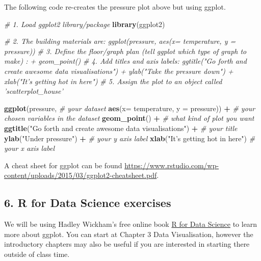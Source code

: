 \documentclass[]{article}
\newenvironment{Shaded}{\begin{snugshade}}{\end{snugshade}}
\newcommand{\CommentTok}[1]{\textcolor[rgb]{0.56,0.35,0.01}{\textit{#1}}}
\newcommand{\DataTypeTok}[1]{\textcolor[rgb]{0.13,0.29,0.53}{#1}}
\newcommand{\KeywordTok}[1]{\textcolor[rgb]{0.13,0.29,0.53}{\textbf{#1}}}
\newcommand{\NormalTok}[1]{#1}
\newcommand{\OperatorTok}[1]{\textcolor[rgb]{0.81,0.36,0.00}{\textbf{#1}}}
\newcommand{\StringTok}[1]{\textcolor[rgb]{0.31,0.60,0.02}{#1}}
\begin{document}
The following code re-creates the pressure plot above but using ggplot.

\begin{Shaded}
\begin{Highlighting}[]
\CommentTok{# 1. Load ggplot2 library/package}
\KeywordTok{library}\NormalTok{(ggplot2)}

\CommentTok{# 2. The building materials are: ggplot(pressure, aes(x= temperature, y = pressure)) }
\CommentTok{# 3. Define the floor/graph plan (tell ggplot which type of graph to make) : + geom_point()}
\CommentTok{# 4. Add titles and axis labels: ggtitle("Go forth and create awesome data visualisations") + ylab("Take the pressure down") + xlab("It's getting hot in here")}
\CommentTok{# 5. Assign the plot to an object called 'scatterplot_house'}

\KeywordTok{ggplot}\NormalTok{(pressure, }\CommentTok{# your dataset}
       \KeywordTok{aes}\NormalTok{(}\DataTypeTok{x=}\NormalTok{ temperature, }\DataTypeTok{y =}\NormalTok{ pressure)) }\OperatorTok{+}\StringTok{ }\CommentTok{# your chosen variables in the dataset}
\StringTok{  }\KeywordTok{geom_point}\NormalTok{() }\OperatorTok{+}\StringTok{ }\CommentTok{# what kind of plot you want}
\StringTok{  }\KeywordTok{ggtitle}\NormalTok{(}\StringTok{"Go forth and create awesome data visualisations"}\NormalTok{) }\OperatorTok{+}\StringTok{ }\CommentTok{# your title}
\StringTok{  }\KeywordTok{ylab}\NormalTok{(}\StringTok{"Under pressure"}\NormalTok{) }\OperatorTok{+}\StringTok{ }\CommentTok{# your y axis label}
\StringTok{  }\KeywordTok{xlab}\NormalTok{(}\StringTok{"It's getting hot in here"}\NormalTok{) }\CommentTok{# your x axis label}
\end{Highlighting}
\end{Shaded}

A cheat sheet for ggplot can be found
\url{https://www.rstudio.com/wp-content/uploads/2015/03/ggplot2-cheatsheet.pdf}.

\hypertarget{r-for-data-science-exercises}{%
\subsection{6. R for Data Science
exercises}\label{r-for-data-science-exercises}}

We will be using Hadley Wickham's free online book
\href{https://r4ds.had.co.nz/.html}{R for Data Science} to learn more
about ggplot. You can start at Chapter 3 Data Visualisation, however the
introductory chapters may also be useful if you are interested in
starting there outside of class time.
\end{document}
